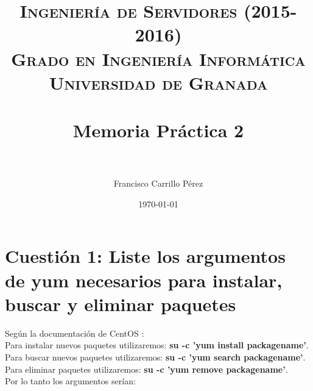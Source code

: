 

\title{	
\normalfont \normalsize 
\textsc{{\bf Ingeniería de Servidores (2015-2016)} \\ Grado en Ingeniería Informática \\ Universidad de Granada} \\ [25pt] %
\horrule{0.5pt} \\[0.4cm] %
\huge Memoria Práctica 2 \\ %
\horrule{2pt} \\[0.5cm] %
}

\author{Francisco Carrillo Pérez} %

\date{\normalsize\today} %




\maketitle %

\newpage %

\tableofcontents %

\listoffigures

\listoftables

\newpage

\section{Cuestión 1: Liste los argumentos de yum necesarios para instalar, buscar y eliminar paquetes}
Según la documentación de CentOS \cite{yum1} \cite{yum2}:\\
Para instalar nuevos paquetes utilizaremos: \textbf{su -c 'yum install packagename'}.\\
Para buscar nuevos paquetes utilizaremos: \textbf{su -c 'yum search packagename'}.\\
Para eliminar paquetes utilizaremos: \textbf{su -c 'yum remove packagename'}.\\
Por lo tanto los argumentos serían:

